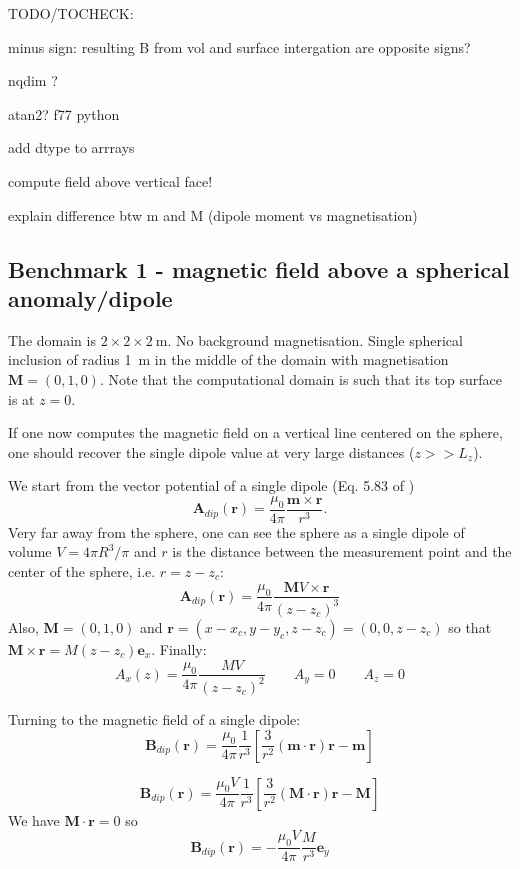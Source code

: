 TODO/TOCHECK:

minus sign: resulting B from vol and surface intergation are opposite signs?

nqdim ? 

atan2? f77 python 

add dtype to arrrays

compute field above vertical face!

explain difference btw m and M (dipole moment vs magnetisation)


\subsection*{Benchmark 1 - magnetic field above a spherical anomaly/dipole}

The domain is $2\times 2\times 2~\si{\meter}$. No background magnetisation. Single spherical inclusion 
of radius \SI{1}{\meter} in the middle of the domain with magnetisation ${\bm M}=(0,1,0)$. 
Note that the computational domain is such that its top surface is at $z=0$.

If one now computes the magnetic field on a vertical line centered on the sphere, one 
should recover the single dipole value at very large distances ($z>>L_z$). 

We start from the vector potential of a single dipole (Eq. 5.83 of \cite{griffiths}) 
\[
{\bm A}_{dip}({\bm r}) = \frac{\mu_0}{4\pi} \frac{{\bm m}\times {\bm r}}{r^3}.
\]
Very far away from the sphere, one can see the sphere as a single dipole of volume $V=4\pi R^3/\pi$
and $r$ is the distance between the measurement point and the center of the sphere, i.e. $r=z-z_c$:
\[
{\bm A}_{dip}({\bm r}) = \frac{\mu_0}{4\pi} \frac{{\bm M} V\times {\bm r}}{(z-z_c)^3}
\]
Also, ${\bm M}=(0,1,0)$ and ${\bm r}=(x-x_c,y-y_c,z-z_c)=(0,0,z-z_c)$ so that ${\bm M}\times {\bm r}=M (z-z_c) {\bm e}_x$.
Finally:
\[
A_x(z)=\frac{\mu_0}{4\pi} \frac{MV}{(z-z_c)^2}  \quad\quad
A_y=0 \quad\quad
A_z=0
\]


Turning to the magnetic field of a single dipole:
\[
{\bm B}_{dip}({\bm r}) = \frac{\mu_0}{4\pi} \frac{1}{r^3} \left[ \frac{3}{r^2} ({\bm m} \cdot {\bm r}) {\bm r} - {\bm m}\right]
\]

\[
{\bm B}_{dip}({\bm r}) = \frac{\mu_0 V}{4\pi} \frac{1}{r^3} \left[ \frac{3}{r^2} ({\bm M} \cdot {\bm r}) {\bm r} - {\bm M}\right]
\]
We have ${\bm M} \cdot {\bm r}=0$ so
\[
{\bm B}_{dip}({\bm r}) = -\frac{\mu_0 V}{4\pi} \frac{M}{r^3}   {\bm e}_y
\]






